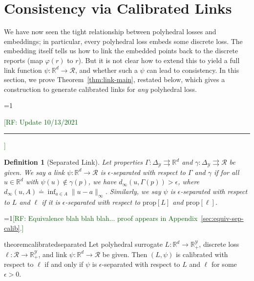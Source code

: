 \documentclass[11pt]{article}
\newcommand{\Comments}{1}
\newcommand{\mynote}[2]{\ifnum\Comments=1\textcolor{#1}{#2}\fi}
\newcommand{\raf}[1]{\mynote{darkgreen}{[RF: #1]}}
\newcommand{\reals}{\mathbb{R}}
\newcommand{\prop}[1]{\mathrm{prop}[#1]}
\newcommand{\simplex}{\Delta_\Y}
\newcommand{\R}{\mathcal{R}}
\newcommand{\Y}{\mathcal{Y}}
\newcommand{\toto}{\rightrightarrows}
\newtheorem{theorem}{Theorem}
\newtheorem{definition}{Definition}
\begin{document}
\section{Consistency via Calibrated Links}
\label{sec:calibration}

We have now seen the tight relationship between polyhedral losses and embeddings; in particular, every polyhedral loss embeds some discrete loss.
The embedding itself tells us how to link the embedded points back to the discrete reports (map $\varphi(r)$ to $r$).
But it is not clear how to extend this to yield a full link function $\psi: \reals^d \to \R$, and whether such a $\psi$ can lead to consistency.
In this section, we prove Theorem~\ref{thm:link-main}, restated below, which gives a construction to generate calibrated links for \emph{any} polyhedral loss.

\linkinformal*

\raf{Update 10/13/2021\hrule}
\begin{definition}[Separated Link]\label{def:sep-link}
  Let properties $\Gamma:\simplex\toto\reals^d$ and $\gamma:\simplex\toto\R$ be given.
  We say a link $\psi:\reals^d\to\R$
  is \emph{$\epsilon$-separated with respect to $\Gamma$ and $\gamma$} if for all $u\in\reals^d$ with $\psi(u)\notin\gamma(p)$, we have $d_\infty(u,\Gamma(p)) > \epsilon$, where $d_\infty(u,A) \doteq \inf_{a\in A} \|u-a\|_\infty$.
  Similarly, we say $\psi$ is $\epsilon$-separated with respect to $L$ and $\ell$ if it is $\epsilon$-separated with respect to $\prop{L}$ and $\prop{\ell}$.
\end{definition}

\raf{Equivalence blah blah blah... proof appears in Appendix~\ref{sec:equiv-sep-calib}.}
\begin{restatable}{theorem}{calibratedseparated}
  Let polyhedral surrogate $L:\reals^d \to \reals^\Y_+$, discrete loss $\ell:\R\to\reals^\Y_+$, and link $\psi:\reals^d\to\R$ be given.
  Then $(L,\psi)$ is calibrated with respect to $\ell$ if and only if
  $\psi$ is $\epsilon$-separated with respect to $L$ and $\ell$ for some
  $\epsilon>0$.
\end{restatable}
\end{document}
